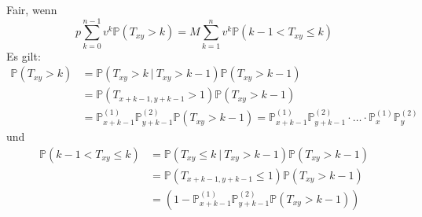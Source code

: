 \begin{itemize}
	Fair, wenn \[p\sum_{k=0}^{n-1}v^k\mathds{P}(T_{xy}>k)=M\sum_{k=1}^{n}v^k\mathds{P}(k-1<T_{xy}\le k) \]
	Es gilt: 
	\begin{equation*}
	\begin{aligned}
		\mathds{P}(T_{xy}>k) &= \mathds{P}(T_{xy}>k~|~T_{xy}>k-1)\mathds{P}(T_{xy}>k-1)\\
		&= \mathds{P}(T_{x+k-1,y+k-1}>1)\mathds{P}(T_{xy}>k-1)\\
		&=\mathds{P}_{x+k-1}^{(1)}\mathds{P}_{y+k-1}^{(2)}\mathds{P}(T_{xy}>k-1)=\mathds{P}_{x+k-1}^{(1)}\mathds{P}_{y+k-1}^{(2)}\cdot \dots \cdot \mathds{P}_x^{(1)}\mathds{P}_y^{(2)}
	\end{aligned}
	\end{equation*}
	und
	\begin{equation*}
	\begin{aligned}
		\mathds{P}(k-1<T_{xy}\le k) &= \mathds{P}(T_{xy}\le k~|~T_{xy}>k-1)\mathds{P}(T_{xy}>k-1)\\
		&= \mathds{P}(T_{x+k-1,y+k-1}\le 1)\mathds{P}(T_{xy}>k-1)\\
		&=(1-\mathds{P}_{x+k-1}^{(1)}\mathds{P}_{y+k-1}^{(2)}\mathds{P}(T_{xy}>k-1))
	\end{aligned}
	\end{equation*}
\end{itemize}


